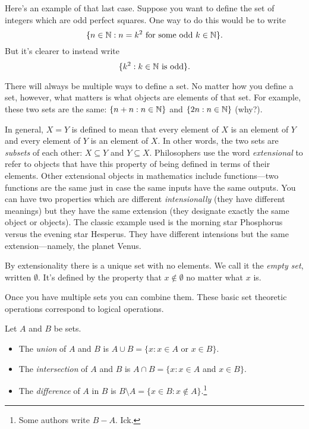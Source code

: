 \documentclass[10pt]{amsart}
\begin{document}
Here's an example of that last case. Suppose you want to define the set of integers which are odd perfect squares. One way to do this would be to write
\[
\{ n \in \mathbb{N} : n = k^2 \text{ for some odd } k \in \mathbb{N} \}.
\]
But it's clearer to instead write
\[
\{ k^2 : k \in \mathbb{N} \text{ is odd} \}.
\]

There will always be multiple ways to define a set. No matter how you define a set, however, what matters is what objects are elements of that set. For example, these two sets are the same: $\{ n+n : n \in \mathbb{N} \}$ and $\{ 2n : n \in \mathbb{N} \}$ (why?).

In general, $X = Y$ is defined to mean that every element of $X$ is an element of $Y$ and every element of $Y$ is an element of $X$. In other words, the two sets are  \emph{subsets} of each other: $X \subseteq Y$ and $Y \subseteq X$. Philosophers use the word \emph{extensional} to refer to objects that have this property of being defined in terms of their elements. Other extensional objects in mathematics include functions---two functions are the same just in case the same inputs have the same outputs. You can have two properties which are different \emph{intensionally} (they have different meanings) but they have the same extension (they designate exactly the same object or objects). The classic example used is the morning star Phosphorus versus the evening star Hesperus. They have different intensions but the same extension---namely, the planet Venus.

By extensionality there is a unique set with no elements. We call it the \emph{empty set}, written $\emptyset$. It's defined by the property that $x \not \in \emptyset$ no matter what $x$ is.

Once you have multiple sets you can combine them. These basic set theoretic operations correspond to logical operations.
\begin{definition}
Let $A$ and $B$ be sets.
\begin{itemize}
\item The \emph{union} of $A$ and $B$ is $A \cup B = \{ x : x \in A$ or $x \in B\}$.
\item The \emph{intersection} of $A$ and $B$ is $A \cap B = \{ x : x \in A$ and $x \in B\}$.
\item The \emph{difference} of $A$ in $B$ is $B \setminus A = \{ x \in B : x \not \in A \}$.\footnote{Some authors write $B - A$. Ick.}
\end{itemize}
\end{definition}
\end{document}
